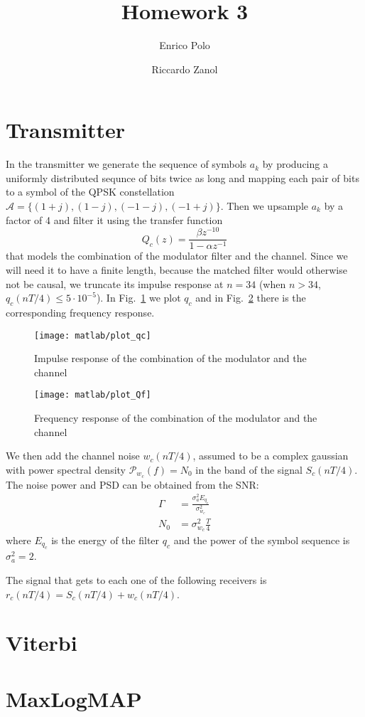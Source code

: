 \documentclass[a4paper,oneside]{article}
\author{Enrico Polo \and Riccardo Zanol}
\title{Homework 3}
\begin{document}
\maketitle
\section*{Transmitter}
In the transmitter we generate the sequence of symbols $a_k$ by
producing a uniformly distributed sequnce of bits twice as long and
mapping each pair of bits to a symbol of the QPSK constellation $
\mathcal{A} = \{(1+j),(1-j),(-1-j),(-1+j)\}$. Then we upsample $a_k$
by a factor of 4 and filter it using the transfer function
\begin{equation}
  Q_c(z) = \frac{\beta z^{-10}}{1 - \alpha z^{-1}}
\end{equation}
that models the {\color{red} combination of the modulator filter and
  the channel}.  Since we will need it to have a finite length,
because the matched filter would otherwise not be causal, we truncate
its impulse response at $n=34$ (when $n > 34$, $q_c(nT/4) \leq
5\cdot10^{-5}$). In Fig.~\ref{plot:qc} we plot $q_c$ and in
Fig.~\ref{plot:Qf} there is the corresponding frequency response.
\begin{figure}[htbp]
  \centering
  \texttt{[image: matlab/plot\_qc]}
  \caption{Impulse response of the combination of the modulator and
    the channel}
  \label{plot:qc}
\end{figure}
\begin{figure}[htbp]
  \centering
  \texttt{[image: matlab/plot\_Qf]}
  \caption{Frequency response of the combination of the modulator and
    the channel}
  \label{plot:Qf}
\end{figure}

We then add {\color{red} the channel noise} $w_c(nT/4)$, assumed to be
a complex gaussian with power spectral density $\mathcal{P}_{w_c}(f) =
N_0$ in the band of the signal $S_c(nT/4)$. The noise power and PSD
can be obtained from the SNR:
\begin{align}
  \Gamma &= \frac{\sigma^2_a E_{q_c}}{\sigma^2_{w_c}} \\
  N_0 &= \sigma^2_{w_c}\frac{T}{4}
\end{align}
where $E_{q_c}$ is the energy of the filter $q_c$ and the power of the
symbol sequence is $\sigma^2_a = 2$.

The signal that gets to each one of the following receivers is
$r_c(nT/4) = S_c(nT/4) + w_c(nT/4)$.
\section*{Viterbi}

\section*{MaxLogMAP}
\end{document}
